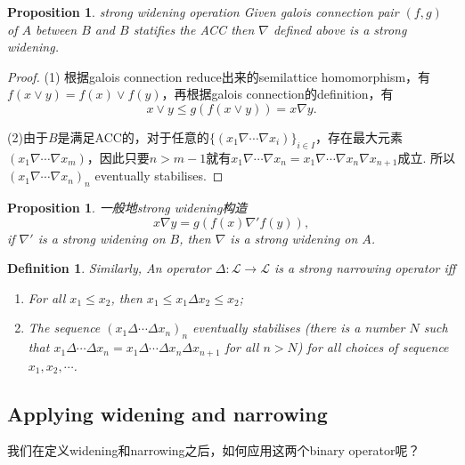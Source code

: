 \documentclass{article}
\newtheorem{proposition}[theorem]{Proposition}
\newtheorem{definition}[theorem]{Definition}
\newcommand*{\xfunc}[4]{{#2}\colon{#3}{#1}{#4}}
\newcommand*{\func}[3]{\xfunc{\to}{#1}{#2}{#3}}
\begin{document}
\begin{proposition}
\rm {\color{red} strong widening operation} Given galois connection pair $(f,g)$ of $A$ between $B$ and $B$ statifies the ACC then $\nabla$ defined above is a strong widening. 
\end{proposition}

\begin{proof}
(1) 根据galois connection reduce出来的semilattice homomorphism，有$f(x \vee y) = f(x) \vee f(y)$，再根据galois connection的definition，有
$$
 x \vee y \leq g(f(x \vee y)) = x \nabla y.
$$

(2)由于$B$是满足ACC的，对于任意的$\{(x_1 \nabla \cdots \nabla x_i)\}_{i \in I}$，存在最大元素$(x_1 \nabla \cdots \nabla x_m)$，因此只要$n > m-1$就有$x_1 \nabla \cdots \nabla x_n = x_1 \nabla \cdots \nabla x_n \nabla x_{n+1}$成立. 所以$(x_1 \nabla \cdots \nabla x_n)_n$ eventually stabilises.
\end{proof}

\begin{proposition}
\rm {\color{red} 一般地strong widening构造}
$$
x \nabla y = g(f(x) \nabla' f(y)), 
$$
if $\nabla'$ is a strong widening on $B$, then $\nabla$ is a strong widening on $A$.
\end{proposition}

\begin{definition}
\rm Similarly, An operator $\func{\Delta}{\mathcal{L}}{\mathcal{L}}$ is a {\color{red} strong narrowing operator} iff
\begin{enumerate}
	\item For all $x_1 \leq x_2$, then $x_1 \leq x_1 \Delta x_2 \leq x_2$;
	\item The sequence $(x_1 \Delta \cdots \Delta x_n)_n$ eventually stabilises (there is a number $N$ such that $x_1 \Delta \cdots \Delta x_n = x_1 \Delta \cdots \Delta x_n \Delta x_{n+1}$ for all $n > N$) for all choices of sequence $x_1,x_2,\cdots$.
\end{enumerate}
\end{definition}

\newpage
\subsection{Applying widening and narrowing}

我们在定义widening和narrowing之后，如何应用这两个binary operator呢？ 
\end{document}
